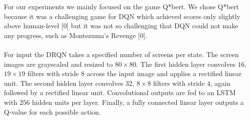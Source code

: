 \documentclass{article}
\begin{document}
For our experiments we mainly focused on the game Q*bert. We chose Q*bert because
it was a challenging game for DQN which achieved scores only slightly above
human-level [0] but it was not so challenging that DQN could not make any progress,
such as Montezuma's Revenge [0]. \\
\\
For input the DRQN takes a specified number of screens per state. The screen images
are grayscaled and resized to $80 \times 80$. The first hidden layer convolves $16$,
$19 \times 19$ filters with stride 8 across the input image and applies a rectified
linear unit.  The second hidden layer convolves $32$, $8 \times 8$ filters with
stride $4$, again followed by a rectified linear unit.  Convolutional outputs are
fed to an LSTM with $256$ hidden units per layer.  Finally, a fully connected
linear layer outputs a Q-value for each possible action. \\
\end{document}
